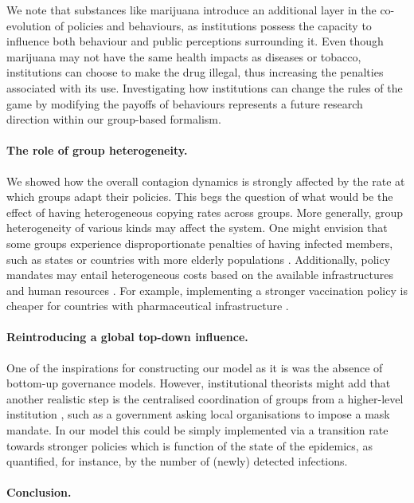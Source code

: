 We note that substances like marijuana introduce an additional layer in the co-evolution of policies and behaviours, as institutions possess the capacity to influence both behaviour and public perceptions surrounding it. Even though marijuana may not have the same health impacts as diseases or tobacco, institutions can choose to make the drug illegal, thus increasing the penalties associated with its use. Investigating how institutions can change the rules of the game by modifying the payoffs of behaviours represents a future research direction within our group-based formalism.

\paragraph*{The role of group heterogeneity.}

We showed how the overall contagion dynamics is strongly affected by the rate at which groups adapt their policies. This begs the question of what would be the effect of having heterogeneous copying rates across groups. 
More generally, group heterogeneity of various kinds may affect the system. One might envision that some groups experience disproportionate penalties of having infected members, such as states or countries with more elderly populations \cite{wong_covid-19_2023}. Additionally, policy mandates may entail heterogeneous costs based on the available infrastructures and human resources \cite{johns_costs_2005}. For example, implementing a stronger vaccination policy is cheaper for countries with pharmaceutical infrastructure \cite{covax_working_group_costs_2021}. 

\paragraph*{Reintroducing a global top-down influence.}
One of the inspirations for constructing our model as it is was the absence of bottom-up governance models. 
However, institutional theorists might add that another realistic step is the centralised coordination of groups from a higher-level institution \cite{ostrom_governing_1990}, such as a government asking local organisations to impose a mask mandate.
In our model this could be simply implemented via a transition rate towards stronger policies which is function of the state of the epidemics, as quantified, for instance, by the number of (newly) detected infections.

\paragraph*{Conclusion.}

